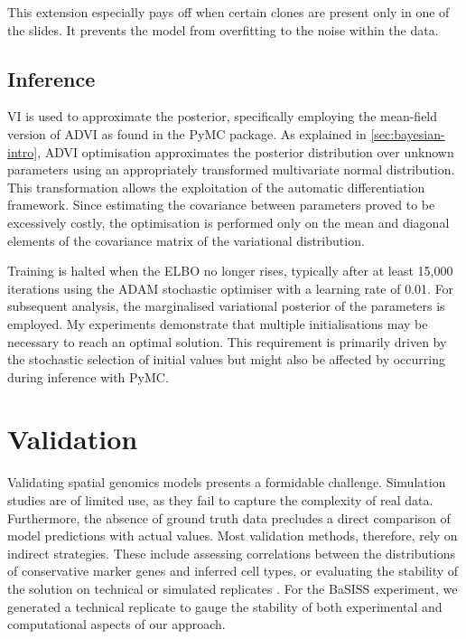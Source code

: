 This extension especially pays off when certain clones are present only in one of the slides. It prevents the model from overfitting to the noise within the data.

\subsection{Inference}
\label{sec:inference}
\acl{VI} is used to approximate the posterior, specifically employing the mean-field version of \ac{ADVI} as found in the \ac{PyMC} package. As explained in \cref{sec:bayesian-intro}, \ac{ADVI} optimisation approximates the posterior distribution over unknown parameters using an appropriately transformed multivariate normal distribution. This transformation allows the exploitation of the automatic differentiation framework. Since estimating the covariance between parameters proved to be excessively costly, the optimisation is performed only on the mean and diagonal elements of the covariance matrix of the variational distribution.

Training is halted when the \ac{ELBO} no longer rises, typically after at least 15,000 iterations using the ADAM stochastic optimiser \parencite{Kingma2014-um} with a learning rate of 0.01. For subsequent analysis, the marginalised variational posterior of the parameters is employed. My experiments demonstrate that multiple initialisations may be necessary to reach an optimal solution. This requirement is primarily driven by the stochastic selection of initial values but might also be affected by  occurring during inference with \ac{PyMC}.

\section{Validation}
\label{sec:bassis-validation}
Validating spatial genomics models presents a formidable challenge. Simulation studies are of limited use, as they fail to capture the complexity of real data. Furthermore, the absence of ground truth data precludes a direct comparison of model predictions with actual values. Most validation methods, therefore, rely on indirect strategies. These include assessing correlations between the distributions of conservative marker genes and inferred cell types, or evaluating the stability of the solution on technical or simulated replicates \parencite{Li2023-ik}. For the \ac{BaSISS} experiment, we generated a technical replicate to gauge the stability of both experimental and computational aspects of our approach.

